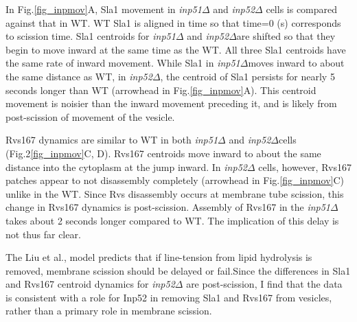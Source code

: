 
 In Fig.\ref{fig_inpmov}A, Sla1 movement in \textit{inp51$\Delta$} and \textit{inp52$\Delta$}
 cells is compared against that in WT. WT Sla1 is aligned in time so that time=0 (s) corresponds to scission time. Sla1 centroids for \textit{inp51$\Delta$} and \textit{inp52$\Delta$}are shifted so that they begin to move inward at the same time as the WT. All three Sla1 centroids have the same rate of inward movement. While Sla1 in \textit{inp51$\Delta$}moves inward to about the same distance as WT, in \textit{inp52$\Delta$}, the centroid of Sla1 persists for nearly 5 seconds longer than WT (arrowhead in Fig.\ref{fig_inpmov}A). This centroid movement is noisier than the inward movement preceding it, and is likely from post-scission of movement of the vesicle. 


\vspace{5mm}	
Rvs167 dynamics are similar to WT in both \textit{inp51$\Delta$}
 and \textit{inp52$\Delta$}cells (Fig.2\ref{fig_inpmov}C, D). Rvs167 centroids move inward to about the same distance into the cytoplasm at the jump inward. In \textit{inp52$\Delta$} cells, however, Rvs167 patches appear to not disassembly completely (arrowhead in Fig.\ref{fig_inpmov}C) unlike in the WT. Since Rvs disassembly occurs at membrane tube scission, this change in Rvs167 dynamics is post-scission. Assembly of Rvs167 in the \textit{inp51$\Delta$}
 takes about 2 seconds longer compared to WT. The implication of this delay is not thus far clear. 

	\vspace{5mm}
The Liu et al., model predicts that if line-tension from lipid hydrolysis is removed, membrane scission should be delayed or fail.Since the differences in Sla1 and Rvs167 centroid dynamics for \textit{inp52$\Delta$} are post-scission, I find that the data is consistent with a role for Inp52 in removing Sla1 and Rvs167 from vesicles, rather than a primary role in membrane scission. 


